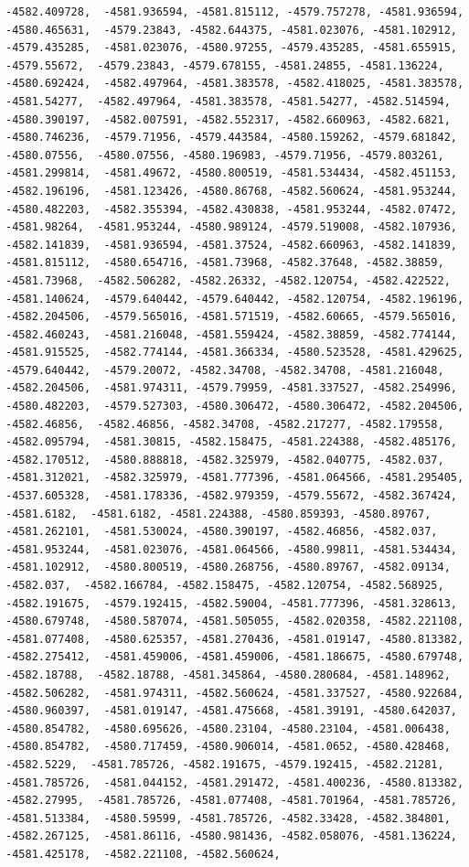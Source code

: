 \documentclass[
]{article}
\begin{document}
\begin{verbatim}
-4582.409728,  -4581.936594, -4581.815112, -4579.757278, -4581.936594, -4580.465631,  -4579.23843, -4582.644375, -4581.023076, -4581.102912, -4579.435285,  -4581.023076, -4580.97255, -4579.435285, -4581.655915, -4579.55672,  -4579.23843, -4579.678155, -4581.24855, -4581.136224, -4580.692424,  -4582.497964, -4581.383578, -4582.418025, -4581.383578, -4581.54277,  -4582.497964, -4581.383578, -4581.54277, -4582.514594, -4580.390197,  -4582.007591, -4582.552317, -4582.660963, -4582.6821, -4580.746236,  -4579.71956, -4579.443584, -4580.159262, -4579.681842, -4580.07556,  -4580.07556, -4580.196983, -4579.71956, -4579.803261, -4581.299814,  -4581.49672, -4580.800519, -4581.534434, -4582.451153, -4582.196196,  -4581.123426, -4580.86768, -4582.560624, -4581.953244, -4580.482203,  -4582.355394, -4582.430838, -4581.953244, -4582.07472, -4581.98264,  -4581.953244, -4580.989124, -4579.519008, -4582.107936, -4582.141839,  -4581.936594, -4581.37524, -4582.660963, -4582.141839, -4581.815112,  -4580.654716, -4581.73968, -4582.37648, -4582.38859, -4581.73968,  -4582.506282, -4582.26332, -4582.120754, -4582.422522, -4581.140624,  -4579.640442, -4579.640442, -4582.120754, -4582.196196, -4582.204506,  -4579.565016, -4581.571519, -4582.60665, -4579.565016, -4582.460243,  -4581.216048, -4581.559424, -4582.38859, -4582.774144, -4581.915525,  -4582.774144, -4581.366334, -4580.523528, -4581.429625, -4579.640442,  -4579.20072, -4582.34708, -4582.34708, -4581.216048, -4582.204506,  -4581.974311, -4579.79959, -4581.337527, -4582.254996, -4580.482203,  -4579.527303, -4580.306472, -4580.306472, -4582.204506, -4582.46856,  -4582.46856, -4582.34708, -4582.217277, -4582.179558, -4582.095794,  -4581.30815, -4582.158475, -4581.224388, -4582.485176, -4582.170512,  -4580.888818, -4582.325979, -4582.040775, -4582.037, -4581.312021,  -4582.325979, -4581.777396, -4581.064566, -4581.295405, -4537.605328,  -4581.178336, -4582.979359, -4579.55672, -4582.367424, -4581.6182,  -4581.6182, -4581.224388, -4580.859393, -4580.89767, -4581.262101,  -4581.530024, -4580.390197, -4582.46856, -4582.037, -4581.953244,  -4581.023076, -4581.064566, -4580.99811, -4581.534434, -4581.102912,  -4580.800519, -4580.268756, -4580.89767, -4582.09134, -4582.037,  -4582.166784, -4582.158475, -4582.120754, -4582.568925, -4582.191675,  -4579.192415, -4582.59004, -4581.777396, -4581.328613, -4580.679748,  -4580.587074, -4581.505055, -4582.020358, -4582.221108, -4581.077408,  -4580.625357, -4581.270436, -4581.019147, -4580.813382, -4582.275412,  -4581.459006, -4581.459006, -4581.186675, -4580.679748, -4582.18788,  -4582.18788, -4581.345864, -4580.280684, -4581.148962, -4582.506282,  -4581.974311, -4582.560624, -4581.337527, -4580.922684, -4580.960397,  -4581.019147, -4581.475668, -4581.39191, -4580.642037, -4580.854782,  -4580.695626, -4580.23104, -4580.23104, -4581.006438, -4580.854782,  -4580.717459, -4580.906014, -4581.0652, -4580.428468, -4582.5229,  -4581.785726, -4582.191675, -4579.192415, -4582.21281, -4581.785726,  -4581.044152, -4581.291472, -4581.400236, -4580.813382, -4582.27995,  -4581.785726, -4581.077408, -4581.701964, -4581.785726, -4581.513384,  -4580.59599, -4581.785726, -4582.33428, -4582.384801, -4582.267125,  -4581.86116, -4580.981436, -4582.058076, -4581.136224, -4581.425178,  -4582.221108, -4582.560624, 
\end{verbatim}
\end{document}
